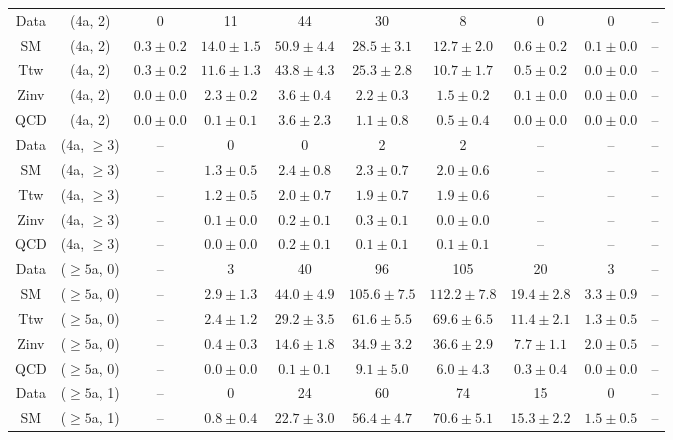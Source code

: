 \begin{table}[h!]
{\begin{tabular}{cccccccccc}
	Data & (4a, 2) & 0 & 11 & 44 & 30 & 8 & 0 & 0 & -- \\[0.5ex] 
	SM & (4a, 2) & $0.3\pm 0.2$ & $14.0\pm 1.5$ & $50.9\pm 4.4$ & $28.5\pm 3.1$ & $12.7\pm 2.0$ & $0.6\pm 0.2$ & $0.1\pm 0.0$ & -- \\[0.5ex] 
	Ttw & (4a, 2) & $0.3\pm 0.2$ & $11.6\pm 1.3$ & $43.8\pm 4.3$ & $25.3\pm 2.8$ & $10.7\pm 1.7$ & $0.5\pm 0.2$ & $0.0\pm 0.0$ & -- \\[0.5ex] 
	Zinv & (4a, 2) & $0.0\pm 0.0$ & $2.3\pm 0.2$ & $3.6\pm 0.4$ & $2.2\pm 0.3$ & $1.5\pm 0.2$ & $0.1\pm 0.0$ & $0.0\pm 0.0$ & -- \\[0.5ex] 
	QCD & (4a, 2) & $0.0\pm 0.0$ & $0.1\pm 0.1$ & $3.6\pm 2.3$ & $1.1\pm 0.8$ & $0.5\pm 0.4$ & $0.0\pm 0.0$ & $0.0\pm 0.0$ & -- \\[0.5ex] 
	Data & (4a, $\ge3$) & -- & 0 & 0 & 2 & 2 & -- & -- & -- \\[0.5ex] 
	SM & (4a, $\ge3$) & -- & $1.3\pm 0.5$ & $2.4\pm 0.8$ & $2.3\pm 0.7$ & $2.0\pm 0.6$ & -- & -- & -- \\[0.5ex] 
	Ttw & (4a, $\ge3$) & -- & $1.2\pm 0.5$ & $2.0\pm 0.7$ & $1.9\pm 0.7$ & $1.9\pm 0.6$ & -- & -- & -- \\[0.5ex] 
	Zinv & (4a, $\ge3$) & -- & $0.1\pm 0.0$ & $0.2\pm 0.1$ & $0.3\pm 0.1$ & $0.0\pm 0.0$ & -- & -- & -- \\[0.5ex] 
	QCD & (4a, $\ge3$) & -- & $0.0\pm 0.0$ & $0.2\pm 0.1$ & $0.1\pm 0.1$ & $0.1\pm 0.1$ & -- & -- & -- \\[0.5ex] 
	Data & ($\ge5$a, 0) & -- & 3 & 40 & 96 & 105 & 20 & 3 & -- \\[0.5ex] 
	SM & ($\ge5$a, 0) & -- & $2.9\pm 1.3$ & $44.0\pm 4.9$ & $105.6\pm 7.5$ & $112.2\pm 7.8$ & $19.4\pm 2.8$ & $3.3\pm 0.9$ & -- \\[0.5ex] 
	Ttw & ($\ge5$a, 0) & -- & $2.4\pm 1.2$ & $29.2\pm 3.5$ & $61.6\pm 5.5$ & $69.6\pm 6.5$ & $11.4\pm 2.1$ & $1.3\pm 0.5$ & -- \\[0.5ex] 
	Zinv & ($\ge5$a, 0) & -- & $0.4\pm 0.3$ & $14.6\pm 1.8$ & $34.9\pm 3.2$ & $36.6\pm 2.9$ & $7.7\pm 1.1$ & $2.0\pm 0.5$ & -- \\[0.5ex] 
	QCD & ($\ge5$a, 0) & -- & $0.0\pm 0.0$ & $0.1\pm 0.1$ & $9.1\pm 5.0$ & $6.0\pm 4.3$ & $0.3\pm 0.4$ & $0.0\pm 0.0$ & -- \\[0.5ex] 
	Data & ($\ge5$a, 1) & -- & 0 & 24 & 60 & 74 & 15 & 0 & -- \\[0.5ex] 
	SM & ($\ge5$a, 1) & -- & $0.8\pm 0.4$ & $22.7\pm 3.0$ & $56.4\pm 4.7$ & $70.6\pm 5.1$ & $15.3\pm 2.2$ & $1.5\pm 0.5$ & -- \\[0.5ex] 

\end{tabular}}
\end{table}
